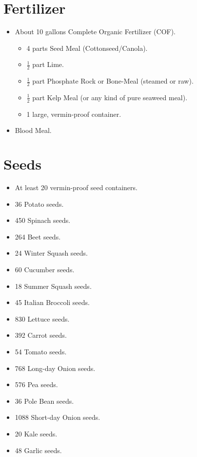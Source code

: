 \documentclass{article}
\begin{document}
\section*{Fertilizer}
\begin{itemize}
	\itemsep0em
	\item About 10 gallons Complete Organic Fertilizer (COF).
	\begin{itemize}
		\itemsep0em
		\item 4 parts Seed Meal (Cottonseed/Canola).
		\item $\frac{1}{2}$ part Lime.
		\item $\frac{1}{2}$ part Phosphate Rock or Bone-Meal (steamed or raw).
		\item $\frac{1}{2}$ part Kelp Meal (or any kind of pure seaweed meal).
		\item 1 large, vermin-proof container.
	\end{itemize}
	\item Blood Meal.
\end{itemize}

\section*{Seeds}
\begin{itemize}
	\itemsep-.05in
	\item At least 20 vermin-proof seed containers.
	\item 36 Potato seeds.
	\item 450 Spinach seeds.
	\item 264 Beet seeds.
	\item 24 Winter Squash seeds.
	\item 60 Cucumber seeds.
	\item 18 Summer Squash seeds.
	\item 45 Italian Broccoli seeds.
	\item 830 Lettuce seeds.
	\item 392 Carrot seeds.
	\item 54 Tomato seeds.
	\item 768 Long-day Onion seeds.
	\item 576 Pea seeds.
	\item 36 Pole Bean seeds.
	\item 1088 Short-day Onion seeds.
	\item 20 Kale seeds.
	\item 48 Garlic seeds.
\end{itemize}
\end{document}
